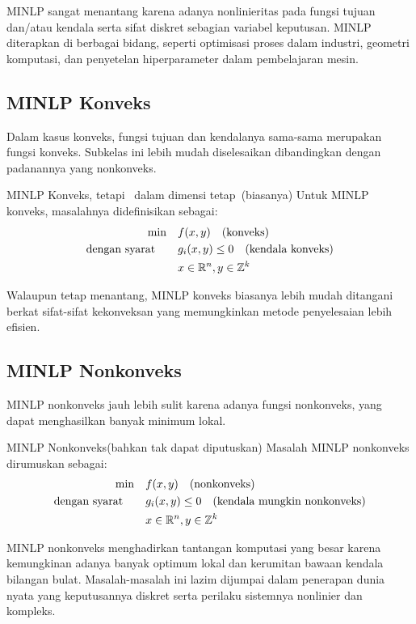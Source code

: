 MINLP sangat menantang karena adanya nonlinieritas pada fungsi tujuan dan/atau kendala serta sifat diskret sebagian variabel keputusan. MINLP diterapkan di berbagai bidang, seperti optimisasi proses dalam industri, geometri komputasi, dan penyetelan hiperparameter dalam pembelajaran mesin.

\Needspace{0.45\textheight}
\subsection{MINLP Konveks}
Dalam kasus konveks, fungsi tujuan dan kendalanya sama-sama merupakan fungsi konveks. Subkelas ini lebih mudah diselesaikan dibandingkan dengan padanannya yang nonkonveks.
\begin{general}{MINLP Konveks}{\nphard, tetapi \polynomial\ dalam dimensi tetap\  (biasanya)}
Untuk MINLP konveks, masalahnya didefinisikan sebagai:
\begin{equation}
\label{eq:convex-minlp}
\begin{split}
\min \quad & f(x, y) \quad \mbox{(konveks)}\\
\mbox{dengan syarat}\quad  \quad & g_i(x, y) \leq 0  \quad  \mbox{(kendala konveks)}\\
           & x \in {\mathbb{R}}^n, y \in {\mathbb{Z}}^k
\end{split}
\end{equation}
\end{general}
Walaupun tetap menantang, MINLP konveks biasanya lebih mudah ditangani berkat sifat-sifat kekonveksan yang memungkinkan metode penyelesaian lebih efisien.

\subsection{MINLP Nonkonveks}
MINLP nonkonveks jauh lebih sulit karena adanya fungsi nonkonveks, yang dapat menghasilkan banyak minimum lokal.
\begin{general}{MINLP Nonkonveks}{\nphard (bahkan tak dapat diputuskan)}
Masalah MINLP nonkonveks dirumuskan sebagai:
\begin{equation}
\label{eq:nonconvex-minlp}
\begin{split}
\min \quad & f(x, y) \quad
\mbox{(nonkonveks)}\\
\mbox{dengan syarat}\quad \quad & g_i(x, y) \leq 0 \quad \mbox{(kendala mungkin nonkonveks)}\\
& x \in {\mathbb{R}}^n, y \in {\mathbb{Z}}^k
\end{split}
\end{equation}
\end{general}
MINLP nonkonveks menghadirkan tantangan komputasi yang besar karena kemungkinan adanya banyak optimum lokal dan kerumitan bawaan kendala bilangan bulat. Masalah-masalah ini lazim dijumpai dalam penerapan dunia nyata yang keputusannya diskret serta perilaku sistemnya nonlinier dan kompleks.

